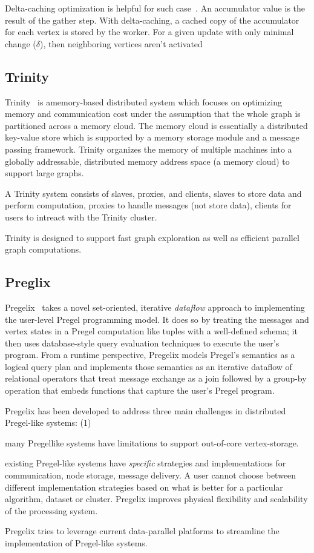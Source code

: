 \documentclass[UTF8,12pt,a4paper]{article}
\begin{document}
Delta-caching optimization is helpful for such case~\cite{DBLP:conf/osdi/GonzalezLGBG12}.
An accumulator value is the result of the gather step.
With delta-caching, a cached copy of the accumulator for each vertex is stored by the worker.
For a given update with only minimal change ($\delta$),
then neighboring vertices aren’t activated

\subsection{Trinity}
Trinity~\cite{DBLP:conf/sigmod/ShaoWL13} is amemory-based distributed system
which focuses on optimizing memory and communication cost under the assumption
that the whole graph is partitioned across a memory cloud.
The memory cloud is essentially a distributed key-value store
which is supported by a memory storage module and a message passing framework.
Trinity organizes the memory of multiple machines into a globally addressable,
distributed memory address space (a memory cloud) to support large graphs.

A Trinity system consists of slaves, proxies, and clients,
slaves to store data and perform computation,
proxies to handle messages (not store data),
clients for users to intreact with the Trinity cluster.

Trinity is designed to support fast graph exploration
as well as efficient parallel graph computations.

\subsection{Preglix}
Pregelix~\cite{DBLP:journals/pvldb/BuBJCC14}
takes a novel set-oriented, iterative \textit{dataflow} approach
to implementing the user-level Pregel programming model.
It does so by treating the messages and vertex states
in a Pregel computation like tuples with a well-defined schema;
it then uses database-style query evaluation techniques to execute the user’s program.
From a runtime perspective, Pregelix models Pregel’s semantics as a logical query plan
and implements those semantics as an iterative dataflow of relational operators
that treat message exchange as a join followed by a group-by operation
that embeds functions that capture the user’s Pregel program.

Pregelix has been developed to address three main challenges
in distributed Pregel-like systems: (1)
\begin{compactitem}
  \item many Pregellike systems have limitations to support out-of-core vertex-storage.
  \item existing Pregel-like systems have \textit{specific} strategies and implementations
  for communication, node storage, message delivery.
  A user cannot choose between different implementation strategies based on
  what is better for a particular algorithm, dataset or cluster.
  Pregelix improves physical flexibility and scalability of the processing system.
  \item  Pregelix tries to leverage current data-parallel platforms to
  streamline the implementation of Pregel-like systems.
\end{compactitem}
\end{document}
